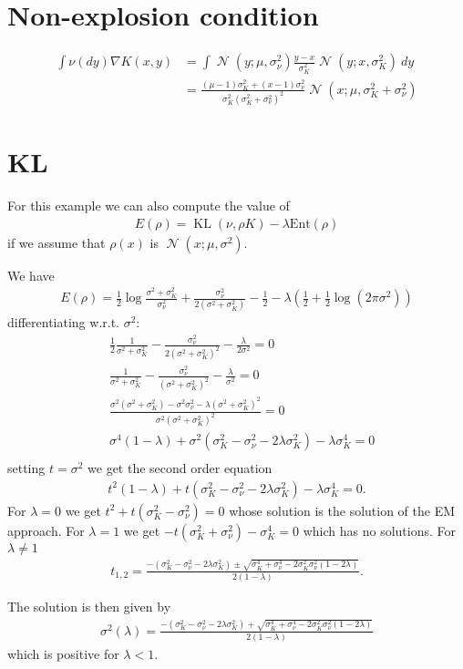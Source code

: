 \documentclass[a4paper]{amsart}
\DeclareMathOperator{\N}{\mathcal{N}}
\DeclareMathOperator{\KL}{KL}
\begin{document}
\section{Non-explosion condition}
\begin{align*}
\int \nu(dy)\nabla K(x, y)&= \int \N(y; \mu, \sigma_{\nu}^2)\frac{y - x}{\sigma_K^2}\N(y; x, \sigma_K^2)\ dy\\
&= \frac{(\mu -1)\sigma_K^2+(x-1)\sigma_\nu^2}{\sigma_K^2(\sigma_K^2 + \sigma_\nu^2)^2}\N(x; \mu, \sigma_K^2+\sigma_\nu^2)
\end{align*}


\section{KL}
For this example we can also compute the value of
\begin{align*}
E(\rho) = \KL(\nu, \rho K) - \lambda \text{Ent}(\rho)
\end{align*}
if we assume that $\rho(x)$ is $\N(x; \mu, \sigma^2)$.

We have
\begin{align*}
E(\rho) = \frac{1}{2}\log \frac{\sigma^2 + \sigma^2_K}{\sigma^2_{\nu}} + \frac{\sigma^2_{\nu}}{2(\sigma^2 + \sigma^2_K)} - \frac{1}{2} - \lambda \left(\frac{1}{2} + \frac{1}{2}\log(2\pi \sigma^2)\right)
\end{align*}
differentiating w.r.t. $\sigma^2$:
\begin{align*}
&\frac{1}{2} \frac{1}{\sigma^2 + \sigma^2_K} - \frac{\sigma^2_{\nu}}{2(\sigma^2 + \sigma^2_K)^2} - \frac{\lambda }{2\sigma^2} = 0\\
&\frac{1}{\sigma^2 + \sigma^2_K} - \frac{\sigma^2_{\nu}}{(\sigma^2 + \sigma^2_K)^2} - \frac{\lambda }{\sigma^2} = 0\\
& \frac{\sigma^2(\sigma^2 + \sigma^2_K) - \sigma^2\sigma_{\nu}^2 - \lambda(\sigma^2 + \sigma^2_K)^2}{\sigma^2(\sigma^2 + \sigma^2_K)^2} = 0\\
& \sigma^4(1 - \lambda) + \sigma^2(\sigma_K^2 - \sigma_{\nu}^2 - 2\lambda\sigma_K^2) - \lambda\sigma_K^4 = 0\\
\end{align*}
setting $t= \sigma^2$ we get the second order equation
\begin{align*}
t^2(1 - \lambda) + t(\sigma_K^2 - \sigma_{\nu}^2 - 2\lambda\sigma_K^2) - \lambda\sigma_K^4 = 0.
\end{align*}
For $\lambda = 0$ we get $t^2 + t(\sigma_K^2 - \sigma_{\nu}^2)= 0$ whose solution is the solution of the EM approach. For $\lambda = 1$ we get $ -t(\sigma_K^2 + \sigma_{\nu}^2) - \sigma_K^4 = 0$ which has no solutions. For $\lambda \neq 1$
\begin{align*}
t_{1, 2} = \frac{-(\sigma_K^2 - \sigma_{\nu}^2 - 2\lambda\sigma_K^2) \pm \sqrt{\sigma_K^4 + \sigma_{\nu}^4 - 2\sigma_K^2\sigma_{\nu}^2(1 - 2\lambda)}}{2(1 - \lambda)}.
\end{align*}

The solution is then given by
\begin{align*}
\sigma^2(\lambda) = \frac{-(\sigma_K^2 - \sigma_{\nu}^2 - 2\lambda\sigma_K^2) + \sqrt{\sigma_K^4 + \sigma_{\nu}^4 - 2\sigma_K^2\sigma_{\nu}^2(1 - 2\lambda)}}{2(1 - \lambda)}
\end{align*}
which is positive for $\lambda<1$.
\end{document}
